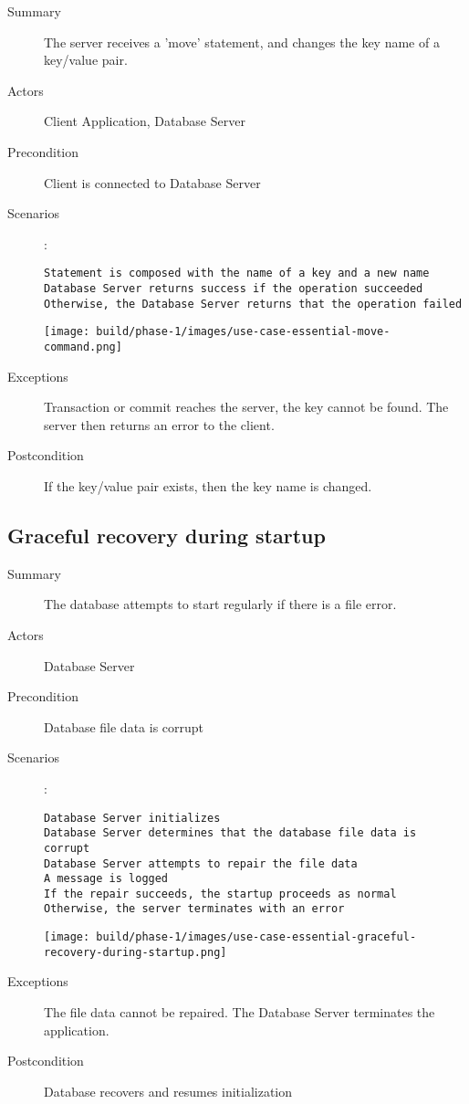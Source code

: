 \documentclass[a4paper]{report}
\begin{document}
	\begin{description}
		\item[Summary] The server receives a 'move' statement, and changes the key name of a key/value pair.
		\item[Actors] Client Application, Database Server
		\item[Precondition] Client is connected to Database Server 
		\item[Scenarios] :

		\begin{lstlisting}
Statement is composed with the name of a key and a new name
Database Server returns success if the operation succeeded
Otherwise, the Database Server returns that the operation failed
		\end{lstlisting}

		\begin{center}
			\texttt{[image: build/phase-1/images/use-case-essential-move-command.png]}
		\end{center}

		\item[Exceptions] Transaction or commit reaches the server, the key cannot be found. The server then returns an error to the client.
		\item[Postcondition] If the key/value pair exists, then the key name is changed.
	\end{description}

	\pagebreak

	\subsection{Graceful recovery during startup}

	\begin{description}
		\item[Summary] The database attempts to start regularly if there is a file error.
		\item[Actors] Database Server
		\item[Precondition] Database file data is corrupt
		\item[Scenarios] :

		\begin{lstlisting}
Database Server initializes
Database Server determines that the database file data is corrupt
Database Server attempts to repair the file data
A message is logged
If the repair succeeds, the startup proceeds as normal
Otherwise, the server terminates with an error
		\end{lstlisting}

		\begin{center}
			\texttt{[image: build/phase-1/images/use-case-essential-graceful-recovery-during-startup.png]}
		\end{center}

		\item[Exceptions] The file data cannot be repaired. The Database Server terminates the application.
		\item[Postcondition] Database recovers and resumes initialization
	\end{description}
\end{document}
